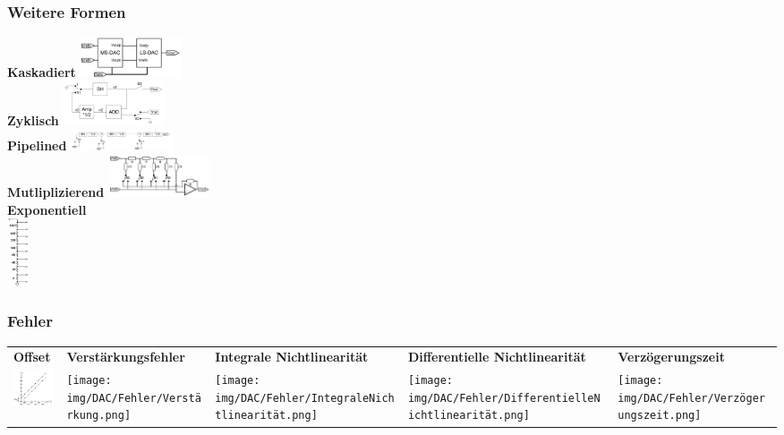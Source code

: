 \documentclass[margin=normal]{tex/hsrzf}
\begin{document}
\begin{multicols}{5}
  \subsubsection*{Weitere Formen}
  \scriptsize
  \textbf{Kaskadiert}
  \includegraphics[width = 3cm]{img/DAC/Kaskadierte_Wandler.png}
  \\\textbf{Zyklisch}
  \includegraphics[width = 3cm]{img/DAC/Zyklischer_DAC.png}
  \\\textbf{Pipelined}
  \includegraphics[width = 3cm]{img/DAC/Pipelined_DAC.png}
  \\\textbf{Mutliplizierend}
  \includegraphics[width = 3cm]{img/DAC/Multiplizierender_Wanlder.png}
  \\\textbf{Exponentiell}
  \\\includegraphics[height = 2cm]{img/DAC/Exponentieller_DAC.png}

  \normalsize
\end{multicols}
\subsubsection*{Fehler}
\begingroup
\small
\begin{tabularx}{\textwidth}{p{}p{}p{}p{}p{}}
  \textbf{Offset}
   &
  \textbf{Verstärkungsfehler}
   &
  \textbf{Integrale \newline Nichtlinearität}
   &
  \textbf{Differentielle Nichtlinearität}
   &
  \textbf{Verzögerungszeit}
  \\
  \includegraphics[width = 2cm]{img/DAC/Fehler/Offset.png}
   &
  \texttt{[image: img/DAC/Fehler/Verstärkung.png]}
   &
  \texttt{[image: img/DAC/Fehler/IntegraleNichtlinearität.png]}
   &
  \texttt{[image: img/DAC/Fehler/DifferentielleNichtlinearität.png]}
   &
  \texttt{[image: img/DAC/Fehler/Verzögerungszeit.png]}
\end{tabularx}
\endgroup
\end{document}
